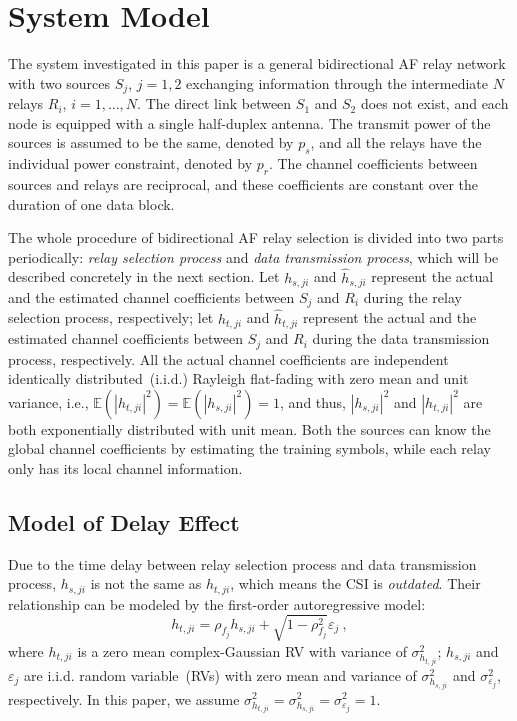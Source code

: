 \documentclass[onecolumn,letterpaper,11pt,draftclsnofoot]{IEEEtran}
\begin{document}
\section{System Model}

The system investigated in this paper is a general bidirectional AF
relay network with two sources $S_j$, $j=1,2$ exchanging information
through the intermediate $N$ relays $R_i$, $i=1,\ldots,N$. The
direct link between $S_1$ and $S_2$ does not exist, and each node is
equipped with a single half-duplex antenna. The transmit power of
the sources is assumed to be the same, denoted by $p_s$, and all the
relays have the individual power constraint, denoted by $p_r$. The
channel coefficients between sources and relays are reciprocal, and
these coefficients are constant over the duration of one data block.

The whole procedure of bidirectional AF relay selection is divided
into two parts periodically: \emph{relay selection process} and
\emph{data transmission process}, which will be described concretely
in the next section. Let $h_{s,ji}$ and $\hat h_{s,ji}$ represent
the actual and the estimated channel coefficients between $S_j$ and
$R_i$ during the relay selection process, respectively; let
$h_{t,ji}$ and $\hat h_{t,ji}$ represent the actual and the
estimated channel coefficients between $S_j$ and $R_i$ during the
data transmission process, respectively. All the actual channel
coefficients are independent identically distributed~(i.i.d.)
Rayleigh flat-fading with zero mean and unit variance, i.e.,
$\mathbb{E}\left(\left| {h_{t,ji} } \right|^2 \right) =
\mathbb{E}\left(\left| {h_{s,ji} } \right|^2 \right) = 1$, and thus,
$\left| {h_{s,ji} } \right|^2$ and $\left| {h_{t,ji} } \right|^2$
are both exponentially distributed with unit mean. Both the sources
can know the global channel coefficients by estimating the training
symbols, while each relay only has its local channel information.

\subsection{Model of Delay Effect}
Due to the time delay between relay selection process and data
transmission process, $h_{s,ji}$ is not the same as $h_{t,ji}$,
which means the CSI is \emph{outdated}. Their relationship can be
modeled by the first-order autoregressive
model\cite{Michalopoulos2010}:
\begin{equation}\label{Eq:outdate}
h_{t,ji}=\rho_{f_j} h_{s,ji} + \sqrt{1-\rho_{f_j}^2}\varepsilon_j~,
\end{equation}
where $h_{t,ji}$ is a zero mean complex-Gaussian RV with variance of
$\sigma _{h_{t,ji}}^2$; $h_{s,ji}$ and $\varepsilon_j$ are i.i.d.
random variable~(RVs) with zero mean and variance of $\sigma _{
h_{s,ji}}^2$ and $\sigma_{\varepsilon_j}^2$, respectively. In this
paper, we assume $\sigma _{ h_{t,ji}}^2=\sigma _{
h_{s,ji}}^2=\sigma_{\varepsilon_j}^2=1$.
\end{document}
